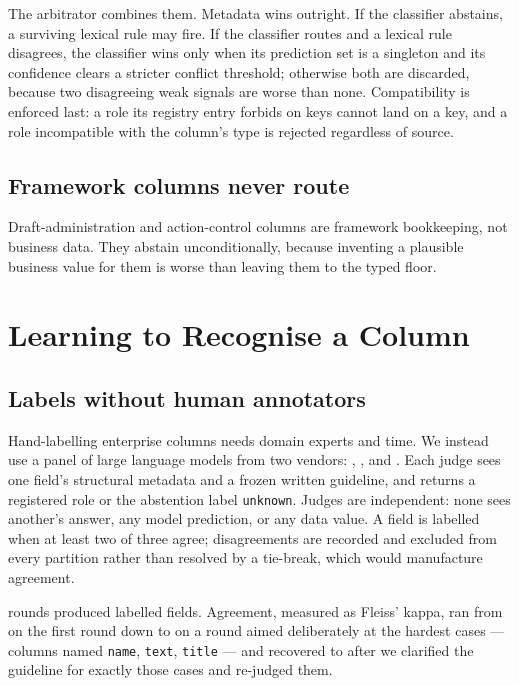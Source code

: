 \documentclass[journal]{IEEEtran}
\newcommand{\code}[1]{\texttt{#1}}
\begin{document}
The arbitrator combines them. Metadata wins outright. If the classifier
abstains, a surviving lexical rule may fire. If the classifier routes
and a lexical rule disagrees, the classifier wins only when its
prediction set is a singleton and its confidence clears a stricter
conflict threshold; otherwise both are discarded, because two
disagreeing weak signals are worse than none. Compatibility is enforced
last: a role its registry entry forbids on keys cannot land on a key,
and a role incompatible with the column's type is rejected regardless of
source.

\subsection{Framework columns never route}

Draft-administration and action-control columns are framework
bookkeeping, not business data. They abstain unconditionally, because
inventing a plausible business value for them is worse than leaving them
to the typed floor.

\section{Learning to Recognise a Column}
\label{sec:learning}

\subsection{Labels without human annotators}

Hand-labelling enterprise columns needs domain experts and time. We
instead use a panel of \LabelJudges{} large language models from two
vendors: \JudgeOne{}, \JudgeTwo{}, and \JudgeThree{}. Each judge sees
one field's structural metadata and a frozen written guideline, and
returns a registered role or the abstention label \code{unknown}. Judges
are independent: none sees another's answer, any model prediction, or
any data value. A field is labelled when at least two of three agree;
disagreements are recorded and excluded from every partition rather than
resolved by a tie-break, which would manufacture agreement.

\LabelRounds{} rounds produced \LabelFields{} labelled fields.
Agreement, measured as Fleiss' kappa, ran from \KappaHigh{} on the first
round down to \KappaLow{} on a round aimed deliberately at the hardest
cases --- columns named \code{name}, \code{text}, \code{title} --- and
recovered to \KappaFinal{} after we clarified the guideline for exactly
those cases and re-judged them.
\end{document}
